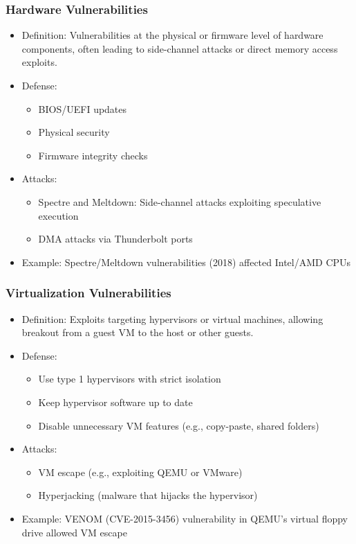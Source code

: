 \documentclass[11pt]{article}
\begin{document}
\subsubsection{Hardware Vulnerabilities}
\label{sec:orgea351ef}
\begin{itemize}
\item Definition: Vulnerabilities at the physical or firmware level of hardware components, often leading to side-channel attacks or direct memory access exploits.
\item Defense:
\begin{itemize}
\item BIOS/UEFI updates
\item Physical security
\item Firmware integrity checks
\end{itemize}
\item Attacks:
\begin{itemize}
\item Spectre and Meltdown: Side-channel attacks exploiting speculative execution
\item DMA attacks via Thunderbolt ports
\end{itemize}
\item Example: Spectre/Meltdown vulnerabilities (2018) affected Intel/AMD CPUs
\end{itemize}
\subsubsection{Virtualization Vulnerabilities}
\label{sec:org3cc6157}
\begin{itemize}
\item Definition: Exploits targeting hypervisors or virtual machines, allowing breakout from a guest VM to the host or other guests.
\item Defense:
\begin{itemize}
\item Use type 1 hypervisors with strict isolation
\item Keep hypervisor software up to date
\item Disable unnecessary VM features (e.g., copy-paste, shared folders)
\end{itemize}
\item Attacks:
\begin{itemize}
\item VM escape (e.g., exploiting QEMU or VMware)
\item Hyperjacking (malware that hijacks the hypervisor)
\end{itemize}
\item Example: VENOM (CVE-2015-3456) vulnerability in QEMU’s virtual floppy drive allowed VM escape
\end{itemize}
\end{document}
